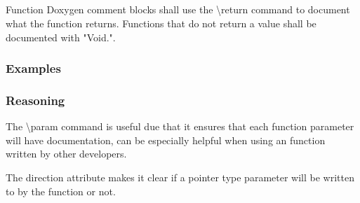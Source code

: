 \subsection*{\doxygenRule{}}

Function Doxygen comment blocks shall use the \textbackslash return command to document what the function returns. Functions that do not return a value shall be documented with "Void.".

\subsubsection*{Examples}

\noindent
\begin{minipage}[t]{0.48\textwidth}
    

\end{minipage}\hfill
\begin{minipage}[t]{0.48\textwidth}
    
\end{minipage}

\subsubsection*{Reasoning}

The \textbackslash param command is useful due that it ensures that each function parameter will have documentation, can be especially helpful when using an function written by other developers.

The direction attribute makes it clear if a pointer type parameter will be written to by the function or not.
